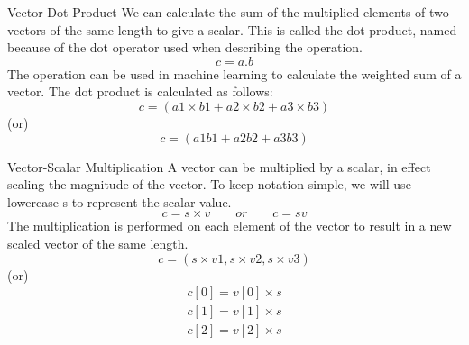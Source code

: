 \documentclass{beamer}
\begin{document}
\begin{frame}
\begin{block}{Vector Dot Product}
We can calculate the sum of the multiplied elements of two vectors of the same length to give a scalar. This is called the dot product, named because of the dot operator used when describing the operation.
    	\begin{equation*}
    		c = a.b
    	\end{equation*}
    The operation can be used in machine learning to calculate the weighted sum of a vector. The dot product is calculated as follows:
    	\begin{equation*}
    		c = (a1 \times b1 + a2 \times b2 + a3 \times b3)
    	\end{equation*}
    	(or)
    	\begin{equation*}
			c = (a1b1 + a2b2 + a3b3)
		\end{equation*}
\end{block}
\end{frame}

\begin{frame}
\begin{block}{Vector-Scalar Multiplication}
    A vector can be multiplied by a scalar, in effect scaling the magnitude of the vector. To keep notation simple, we will use lowercase s to represent the scalar value.
    	\begin{equation*}
    		c = s \times v \qquad or \qquad c = sv
    	\end{equation*}
    The multiplication is performed on each element of the vector to result in a new scaled vector of the same length.
    	\begin{equation*}
    		c = (s \times v1, s \times v2, s \times v3)
    	\end{equation*}
    	(or)
    	\begin{equation*}
			\begin{split}
				c[0] = v[0] \times s \\
				c[1] = v[1] \times s \\
				c[2] = v[2] \times s
			\end{split}
		\end{equation*}
\end{block}
\end{frame}
\end{document}
